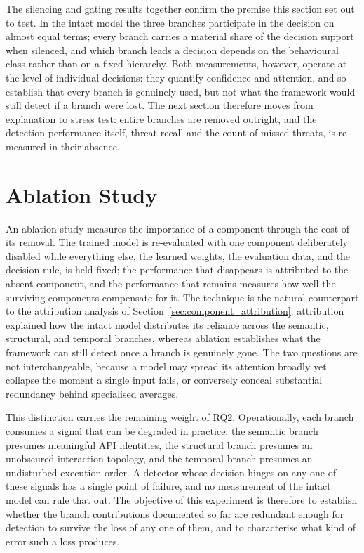 \documentclass[%
    BCOR=10mm,
    DIV=13,
    toc=bibliography,
    toc=listof,
    oneside,
    12pt,
]{scrbook}
\begin{document}
The silencing and gating results together confirm the premise this section set
out to test. In the intact model the three branches participate in the decision
on almost equal terms;
every branch carries a material share of the decision support when silenced,
and which branch leads a decision depends on the behavioural class rather than
on a fixed hierarchy. Both measurements, however, operate at the level of
individual decisions: they quantify confidence and attention, and so establish
that every branch is genuinely used, but not what the framework would still
detect if a branch were lost. The next section therefore moves from explanation
to stress test: entire branches are removed outright, and the detection
performance itself, threat recall and the count of missed threats, is
re-measured in their absence.


\section{Ablation Study}
\label{sec:ablation_results}

An ablation study measures the importance of a component through the cost of
its removal. The trained model is re-evaluated with one component deliberately
disabled while everything else, the learned weights, the evaluation data, and
the decision rule, is held fixed; the performance that disappears is
attributed to the absent component, and the performance that remains measures
how well the surviving components compensate for it. The technique is the
natural counterpart to the attribution analysis of
Section~\ref{sec:component_attribution}: attribution explained how the intact
model distributes its reliance across the semantic, structural, and temporal
branches, whereas ablation establishes what the framework can still detect
once a branch is genuinely gone. The two questions are not interchangeable,
because a model may spread its attention broadly yet collapse the moment a
single input fails, or conversely conceal substantial redundancy behind
specialised averages.

This distinction carries the remaining weight of RQ2. Operationally, each
branch consumes a signal that can be degraded in practice: the semantic branch
presumes meaningful API identities, the structural branch presumes an
unobscured interaction topology, and the temporal branch presumes an
undisturbed execution order. A detector whose decision hinges on any one of
these signals has a single point of failure, and no measurement of the intact
model can rule that out. The objective of this experiment is therefore to
establish whether the branch contributions documented so far are redundant
enough for detection to survive the loss of any one of them, and to
characterise what kind of error such a loss produces.
\end{document}
